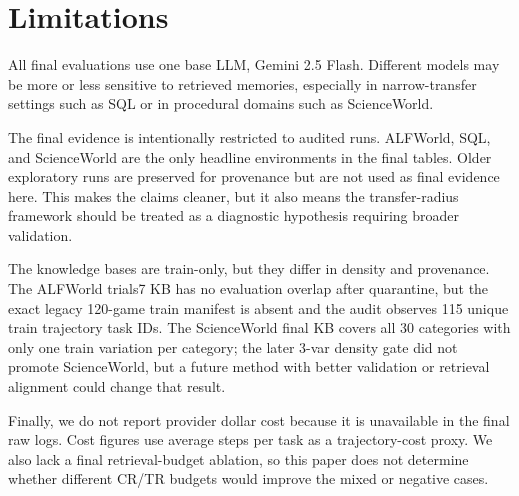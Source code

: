 \section{Limitations}
\label{sec:limitations}

All final evaluations use one base LLM, Gemini 2.5 Flash.
Different models may be more or less sensitive to retrieved memories, especially in narrow-transfer settings such as SQL or in procedural domains such as ScienceWorld.

The final evidence is intentionally restricted to audited runs.
ALFWorld, SQL, and ScienceWorld are the only headline environments in the final tables.
Older exploratory runs are preserved for provenance but are not used as final evidence here.
This makes the claims cleaner, but it also means the transfer-radius framework should be treated as a diagnostic hypothesis requiring broader validation.

The knowledge bases are train-only, but they differ in density and provenance.
The ALFWorld trials7 KB has no evaluation overlap after quarantine, but the exact legacy 120-game train manifest is absent and the audit observes 115 unique train trajectory task IDs.
The ScienceWorld final KB covers all 30 categories with only one train variation per category; the later 3-var density gate did not promote ScienceWorld, but a future method with better validation or retrieval alignment could change that result.

Finally, we do not report provider dollar cost because it is unavailable in the final raw logs.
Cost figures use average steps per task as a trajectory-cost proxy.
We also lack a final retrieval-budget ablation, so this paper does not determine whether different CR/TR budgets would improve the mixed or negative cases.
